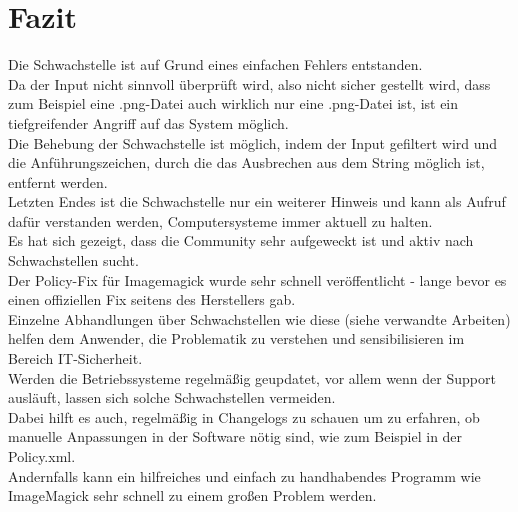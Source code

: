 \chapter{Fazit}\label{ch:fazit}

Die Schwachstelle ist auf Grund eines einfachen Fehlers entstanden.\\
Da der Input nicht sinnvoll überprüft wird, also nicht sicher gestellt wird, dass zum Beispiel eine .png-Datei auch wirklich nur eine .png-Datei ist, ist ein tiefgreifender Angriff auf das System möglich.\\

Die Behebung der Schwachstelle ist möglich, indem der Input gefiltert wird und die Anführungszeichen, durch die das Ausbrechen aus dem String möglich ist, entfernt werden.\\

Letzten Endes ist die Schwachstelle nur ein weiterer Hinweis und kann als Aufruf dafür verstanden werden, Computersysteme immer aktuell zu halten.\\
Es hat sich gezeigt, dass die Community sehr aufgeweckt ist und aktiv nach Schwachstellen sucht.\\
Der Policy-Fix für Imagemagick wurde sehr schnell veröffentlicht - lange bevor es einen offiziellen Fix seitens des Herstellers gab.\\
Einzelne Abhandlungen über Schwachstellen wie diese (siehe verwandte Arbeiten) helfen dem Anwender, die Problematik zu verstehen und sensibilisieren im Bereich IT-Sicherheit.\\

Werden die Betriebssysteme regelmäßig geupdatet, vor allem wenn der Support ausläuft, lassen sich solche Schwachstellen vermeiden.\\
Dabei hilft es auch, regelmäßig in Changelogs zu schauen um zu erfahren, ob manuelle Anpassungen in der Software nötig sind, wie zum Beispiel in der Policy.xml.\\

Andernfalls kann ein hilfreiches und einfach zu handhabendes Programm wie ImageMagick sehr schnell zu einem großen Problem werden.